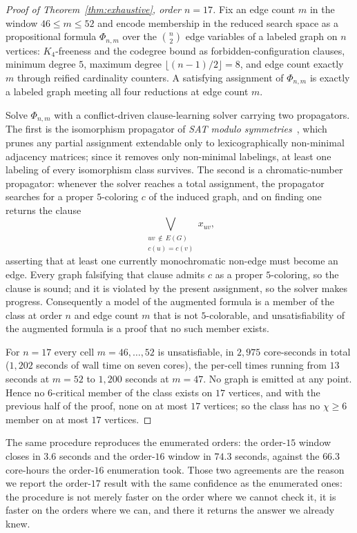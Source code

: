 \documentclass[11pt]{article}
\theoremstyle{definition}
\newcommand{\chrom}{\chi}
\begin{document}
\begin{proof}[Proof of Theorem~\ref{thm:exhaustive}, order $n = 17$]
Fix an edge count $m$ in the window $46 \le m \le 52$ and encode membership in
the reduced search space as a propositional formula $\Phi_{n,m}$ over the
$\binom{n}{2}$ edge variables of a labeled graph on $n$ vertices: $K_4$-freeness
and the codegree bound as forbidden-configuration clauses, minimum degree $5$,
maximum degree $\lfloor (n-1)/2 \rfloor = 8$, and edge count exactly $m$ through
reified cardinality counters. A satisfying assignment of $\Phi_{n,m}$ is exactly a
labeled graph meeting all four reductions at edge count $m$.

Solve $\Phi_{n,m}$ with a conflict-driven clause-learning solver carrying two
propagators. The first is the isomorphism propagator of \emph{SAT modulo
symmetries}~\cite{KirchwegerSzeider2021}, which prunes any partial assignment
extendable only to lexicographically non-minimal adjacency matrices; since it
removes only non-minimal labelings, at least one labeling of every isomorphism
class survives. The second is a chromatic-number propagator: whenever the solver
reaches a total assignment, the propagator searches for a proper $5$-coloring $c$
of the induced graph, and on finding one returns the clause
\[
  \bigvee_{\substack{uv \,\notin\, E(G) \\ c(u) = c(v)}} x_{uv},
\]
asserting that at least one currently monochromatic non-edge must become an edge.
Every graph falsifying that clause admits $c$ as a proper $5$-coloring, so the
clause is sound; and it is violated by the present assignment, so the solver makes
progress. Consequently a model of the augmented formula is a member of the class
at order $n$ and edge count $m$ that is not $5$-colorable, and unsatisfiability of
the augmented formula is a proof that no such member exists.

For $n = 17$ every cell $m = 46, \dots, 52$ is unsatisfiable, in $2{,}975$ core-seconds
in total ($1{,}202$ seconds of wall time on seven cores), the per-cell times running
from $13$ seconds at $m = 52$ to $1{,}200$ seconds at $m = 47$. No graph is emitted
at any point. Hence no $6$-critical member of the class exists on $17$ vertices,
and with the previous half of the proof, none on at most $17$ vertices; so the
class has no $\chrom \ge 6$ member on at most $17$ vertices.
\end{proof}

The same procedure reproduces the enumerated orders: the order-$15$ window closes
in $3.6$ seconds and the order-$16$ window in $74.3$ seconds, against the $66.3$
core-hours the order-$16$ enumeration took. Those two agreements are the reason we
report the order-$17$ result with the same confidence as the enumerated ones: the
procedure is not merely faster on the order where we cannot check it, it is faster
on the orders where we can, and there it returns the answer we already knew.
\end{document}
